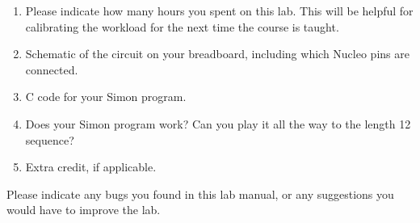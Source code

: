 \documentclass{../../e85}
\date{2019 April 1 (Monday)}
\author{}
\begin{document}
\begin{enumerate}
\item Please indicate how many hours you spent on this lab.  This will
  be helpful for calibrating the workload for the next time the course
  is taught.

  \begin{solution}

  \end{solution}

\item Schematic of the circuit on your breadboard, including which
  Nucleo pins are connected.

  \begin{solution}

  \end{solution}

\item C code for your Simon program.

  \begin{solution}

  \end{solution}

\item Does your Simon program work?  Can you play it all the way to
  the length 12 sequence?

  \begin{solution}

  \end{solution}

\item Extra credit, if applicable.
\end{enumerate}

Please indicate any bugs you found in this lab manual, or any
suggestions you would have to improve the lab.
\end{document}
